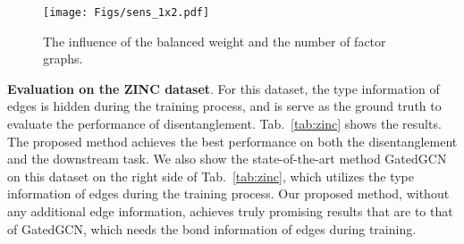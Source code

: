 \documentclass{article}
\begin{document}
\begin{table}
  \caption{Accuracy~(\%) on three graph classification datasets. 
  FactorGCN performances on par with or better 
  than the state-of-the-art
  GCN models. We highlight the best DL-based methods and non DL-based methods
  separately. FactorGCN uses the same hyper-parameters for all datasets.}
  \label{tab:other}
  \centering
\end{table}

\begin{table}[ht]
  \caption{Accuracy~(\%) on the Pattern dataset 
  for node-classification task. 
  FactorGCN achieves the best performance, 
  showing its ability to serve as a general GCN framework.}
\label{tab:pattern}
  \centering
\end{table}

\begin{figure}[ht]
  \centering
  \texttt{[image: Figs/sens\_1x2.pdf]}
\caption{The influence of the balanced weight  and 
  the number of factor graphs.}
\label{fig:sens}
\end{figure}


\textbf{Evaluation on the ZINC dataset}. 
For this dataset, the type information of edges is 
hidden during the training process,
and is serve as the ground truth to evaluate the performance of
disentanglement. Tab.~\ref{tab:zinc} shows the results. The proposed method
achieves the best performance on both the disentanglement
and the downstream task. 
We also show the state-of-the-art method GatedGCN
on this dataset on the right side of Tab.~\ref{tab:zinc}, which utilizes
the type information of edges during the training process.
Our proposed method, without any additional edge information,
achieves truly promising results that are
to that of GatedGCN, which {needs the bond information
of edges during training.}
\end{document}
